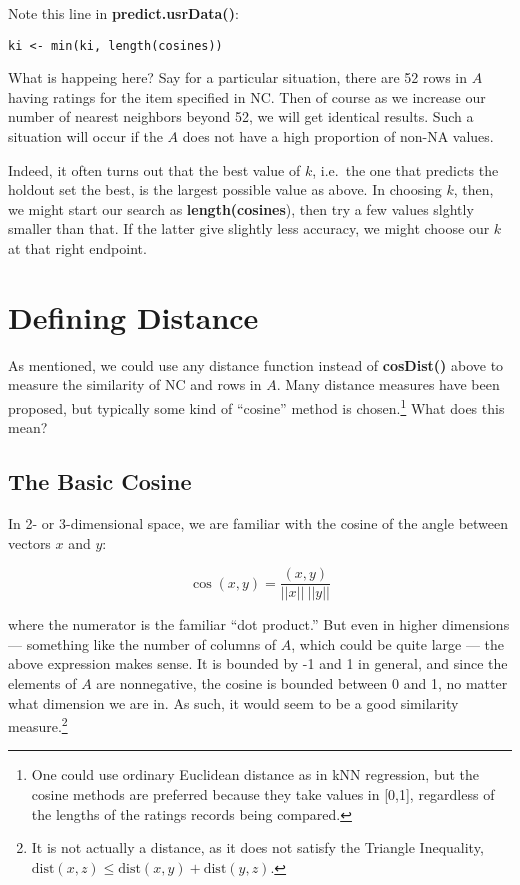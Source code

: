 Note this line in \textbf{predict.usrData()}:

\begin{lstlisting}
ki <- min(ki, length(cosines))
\end{lstlisting}

What is happeing here?  Say for a particular situation, there are 52
rows in $A$ having ratings for the item specified in NC.  Then of course
as we increase our number of nearest neighbors beyond 52, we will get
identical results.  Such a situation will occur if the $A$ does not have
a high proportion of non-NA values.  

Indeed, it often turns out that the best value of $k$, i.e.\ the one
that predicts the holdout set the best, is the largest possible value as
above.  In choosing $k$, then, we might start our search as
\textbf{length(cosines}), then try a few values slghtly smaller than
that.  If the latter give slightly less accuracy, we might choose our
$k$ at that right endpoint.

\section{Defining Distance}

As mentioned, we could use any distance function instead of
\textbf{cosDist()} above to measure the similarity of NC and rows in
$A$.  Many distance measures have been proposed, but typically some kind
of ``cosine'' method is chosen.\footnote{One could use ordinary
Euclidean distance as in kNN regression, but the cosine methods are
preferred because they take values in [0,1], regardless of the lengths
of the ratings records being compared.} What does this mean?

\subsection{The Basic Cosine}

In 2- or 3-dimensional space, we are familiar with the cosine of the
angle between vectors $x$ and $y$:

\begin{equation}
\cos(x,y) = \frac{(x,y)}{||x|| ~ ||y||}
\end{equation}

where the numerator is the familiar ``dot product.''  But even in higher
dimensions --- something like the number of columns of $A$, which could
be quite large --- the above expression makes sense.  It is bounded by
-1 and 1 in general, and since the elements of $A$ are nonnegative, the
cosine is bounded between 0 and 1, no matter what dimension we are in.
As such, it would seem to be a good similarity measure.\footnote{It is
not actually a distance, as it does not satisfy the Triangle Inequality,
$\textrm{dist}(x,z) \leq \textrm{dist}(x,y) + \textrm{dist}(y,z)$.}

